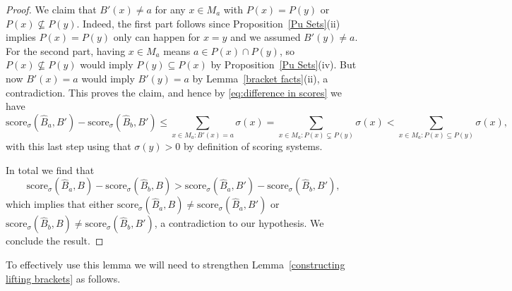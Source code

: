 \documentclass[12pt,letterpaper]{article}
\theoremstyle{definition}
\newcommand{\sig}{\sigma}
\renewcommand{\1}{\mathbbm{1}}
\newcommand{\sub}{\subseteq}
\newcommand{\score}{\mathrm{score}}
\begin{document}
\begin{proof}
	We claim that $B'(x)\ne a$ for any $x\in M_a$ with $P(x)=P(y)$ or $P(x)\not\sub P(y)$.  Indeed, the first part follows since Proposition~\ref{Pu Sets}(ii) implies $P(x)=P(y)$ only can happen for $x=y$ and we assumed $B'(y)\ne a$.  For the second part, having $x\in M_a$ means $a\in P(x)\cap P(y)$, so $P(x)\not \sub P(y)$ would imply $P(y)\sub P(x)$ by Proposition~\ref{Pu Sets}(iv).  But now $B'(x)=a$ would imply $B'(y)=a$ by Lemma~\ref{bracket facts}(ii), a contradiction.  This proves the claim, and hence by \eqref{eq:difference in scores} we have 
	\[\score_\sig(\widehat{B}_a,B')-\score_\sig(\widehat{B}_b,B')\le \sum_{x\in M_a:B'(x)=a}\sig(x)= \sum_{x\in M_a: P(x)\subsetneq P(y)}\sig(x)< \sum_{x\in M_a: P(x)\sub P(y)} \sig(x),\]
	with this last step using that $\sig(y)>0$ by definition of scoring systems.
	
	In total we find that 
	\[\score_\sig(\widehat{B}_a,B)-\score_\sig(\widehat{B}_b,B)>\score_\sig(\widehat{B}_a,B')-\score_\sig(\widehat{B}_b,B'),\]
	which implies that either  $\score_\sig(\widehat{B}_a,B)\ne \score_\sig(\widehat{B}_a,B')$ or $\score_\sig(\widehat{B}_b,B)\ne \score_\sig(\widehat{B}_b,B')$, a contradiction to our hypothesis.  We conclude the result.
\end{proof}

To effectively use this lemma we will need to strengthen Lemma~\ref{constructing lifting brackets} as follows.
\end{document}
